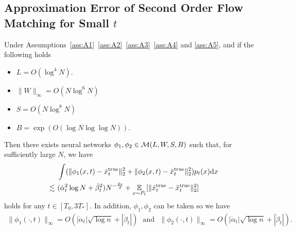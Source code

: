 \subsection{Approximation Error of Second Order Flow Matching for Small \texorpdfstring{$t$}{}}
\begin{theorem}\label{thm:secon_order_small_t:formal}
    Under Assumptions~\ref{ass:A1}~\ref{ass:A2}~\ref{ass:A3}~\ref{ass:A4} and \ref{ass:A5}, and if the following holds 
    \begin{itemize}
        \item $L = O(\log^4 N )$.
        \item $\|W\|_{\infty} = O(N \log^{6} N)$
        \item $S = O(N \log^{8} N)$
        \item $B = \exp(O (\log N \log \log N ) ).$
    \end{itemize}
    Then there exists neural networks $\phi_{1},\phi_2  \in  {\cal M}(L,W,S,B)$ such that, for sufficiently large $N$, we have
\begin{align*}
    &~ \int (\|\phi_1(x, t) - \dot{x}_t^\mathrm{true}\|_2^2 + \|\phi_2(x, t) - \ddot{x}_t^\mathrm{true}\|_2^2) p_t(x) \mathrm{d} x \\ \lesssim &~ (\dot{\alpha}_t^2 \log N + \dot{\beta}_t^2 ) N^{- \frac{2s}{d}} +
    \operatorname*{{\mathbb{E}}}_{x \sim P_t}[\|\dot{x}^\mathrm{true}_t - \ddot{x}^\mathrm{true}_t\|_2^2]
\end{align*}
    holds for any $t \in [T_{0}, 3T_{*}]$. In addition, $\phi_1, \phi_2$ can be taken so we have
    \begin{align*}
         \|\phi_1(\cdot,t) \|_\infty = O(  |\dot{\alpha}_t | \sqrt{\log n} +  |\dot{\beta}_t |) \mathrm{~~~and~~~} \|\phi_2(\cdot,t) \|_\infty = O(  |\dot{\alpha}_t | \sqrt{\log n} +  |\dot{\beta}_t |).
    \end{align*}
\end{theorem}

